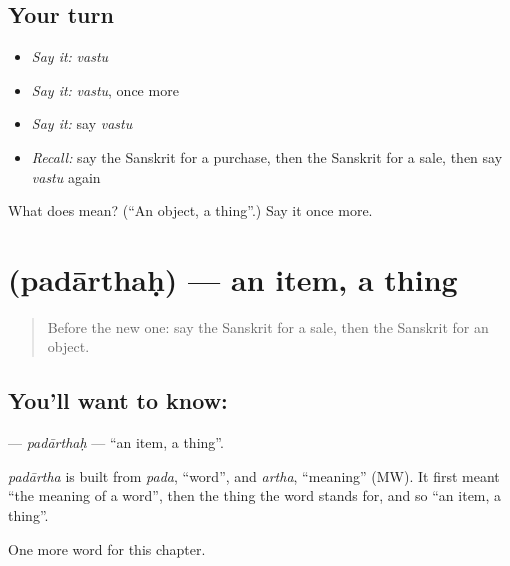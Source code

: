 \subsection*{Your turn}
\begin{itemize}
\raggedright
  \item \emph{Say it:} \emph{vastu}
  \item \emph{Say it:} \emph{vastu}, once more
  \item \emph{Say it:} say \emph{vastu}
  \item \emph{Recall:} say the Sanskrit for a purchase, then the Sanskrit for a sale, then say \emph{vastu} again
\end{itemize}

\begin{tcolorbox}[breakable,colback=teal!4,colframe=teal!35!black,title={Before you move on}]
What does  mean? (\textquotedblleft{}An object, a thing\textquotedblright{}.) Say it once more.
\end{tcolorbox}
\section[\texorpdfstring{\sk{पदार्थः} (padārthaḥ)}{पदार्थः (padārthaḥ)}]{ (padārthaḥ) — an item, a thing}

\label{lesson:SA-C193-padarthah}



\begin{quote}
Before the new one: say the Sanskrit for a sale, then the Sanskrit for an object.
\end{quote}

\subsection*{You'll want to know: }
\textbf{} — \emph{padārthaḥ} — \textquotedblleft{}an item, a thing\textquotedblright{}.

\begin{cousinweb}
\emph{padārtha} is built from \emph{pada}, \textquotedblleft{}word\textquotedblright{}, and \emph{artha}, \textquotedblleft{}meaning\textquotedblright{} (MW). It first meant \textquotedblleft{}the meaning of a word\textquotedblright{}, then the thing the word stands for, and so \textquotedblleft{}an item, a thing\textquotedblright{}.
\end{cousinweb}

\begin{grammarlens}[title={What you've built}]
One more word for this chapter.
\end{grammarlens}

